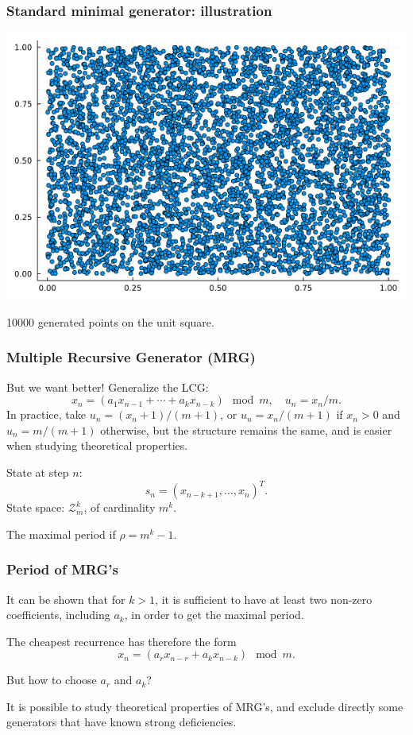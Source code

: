 \documentclass{beamer}
\begin{document}
	\begin{frame}
		\frametitle{Standard minimal generator: illustration}
		\begin{center}
			\includegraphics[width=0.8\linewidth]{imgs/lcg.png}
			
			10000 generated points on the unit square.
		\end{center}
		
	\end{frame}
	
	\begin{frame}
		\frametitle{Multiple Recursive Generator (MRG)}
		
		But we want better! Generalize the LCG:
		\[
		x_n = (a_1 x_{n-1} + \cdots + a_k x_{n-k}) \mod {m}, \quad  
		u_n = x_n / m.
		\]
		In practice, take $u_n = (x_n + 1) / (m+1)$, or $u_n =
		x_n/(m+1)$ if $x_n>0$ and $u_n = m/(m+1)$ otherwise, but the structure
		remains the same, and is easier when studying theoretical properties.
		
		\mbox{}
		
		State at step $n$:
		\[
		s_n = (x_{n-k+1},\dots,x_n)^T.
		\]
		State space: $\mathcal{Z}_m^k$, of cardinality $m^k$.
		
		\mbox{}
		
		The maximal period if $\rho = m^k-1$.
		
	\end{frame}
	
	\begin{frame}
		\frametitle{Period of MRG's}
		
		It can be shown that for $k > 1$, it is sufficient to have at least
		two non-zero coefficients, including $a_k$, in order to get the maximal period.
		
		\mbox{}
		
		The cheapest recurrence has therefore the form
		\[
		x_n = (a_r x_{n-r} + a_k x_{n-k}) \mod m.
		\]
		
		\mbox{}
		
		But how to choose $a_r$ and $a_k$?
		
		\mbox{}
		
		It is possible to study theoretical properties of MRG's, and exclude
		directly some generators that have known strong deficiencies.
		
	\end{frame}
	
\end{document}
